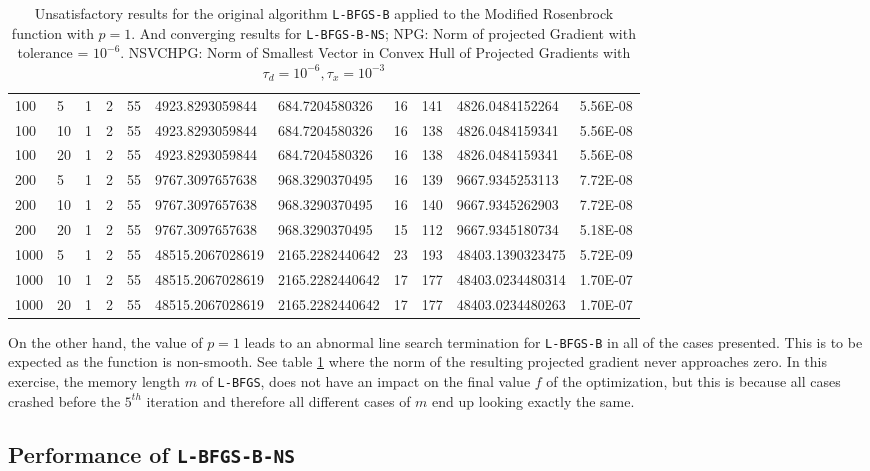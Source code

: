 \begin{table}
\begin{center}
\begin{tabular}{|l|l|l|l|l|l|l|l|l|l|l|}
      100 & 5 & 1 & 2 & 55 & 4923.8293059844 & 684.7204580326 & 16 & 141 & 4826.0484152264 & 5.56E-08\\
      100 & 10 & 1 & 2 & 55 & 4923.8293059844 & 684.7204580326 & 16 & 138 & 4826.0484159341 & 5.56E-08\\
      100 & 20 & 1 & 2 & 55 & 4923.8293059844 & 684.7204580326 & 16 & 138 & 4826.0484159341 & 5.56E-08\\
      200 & 5 & 1 & 2 & 55 & 9767.3097657638 & 968.3290370495 & 16 & 139 & 9667.9345253113 & 7.72E-08\\
      200 & 10 & 1 & 2 & 55 & 9767.3097657638 & 968.3290370495 & 16 & 140 & 9667.9345262903 & 7.72E-08\\
      200 & 20 & 1 & 2 & 55 & 9767.3097657638 & 968.3290370495 & 15 & 112 & 9667.9345180734 & 5.18E-08\\
      1000 & 5 & 1 & 2 & 55 & 48515.2067028619 & 2165.2282440642 & 23 & 193 & 48403.1390323475 & 5.72E-09\\
      1000 & 10 & 1 & 2 & 55 & 48515.2067028619 & 2165.2282440642 & 17 & 177 & 48403.0234480314 & 1.70E-07\\
      1000 & 20 & 1 & 2 & 55 & 48515.2067028619 & 2165.2282440642 & 17 & 177 & 48403.0234480263 & 1.70E-07\\
      \hline
    \end{tabular}
    \caption[Modified Rosenbrock with $p = 1$]{Unsatisfactory results for the original algorithm \texttt{L-BFGS-B} applied to the Modified Rosenbrock function with $p = 1$. And converging results for \texttt{L-BFGS-B-NS}; NPG: Norm of projected Gradient with tolerance = $10^{-6}$. NSVCHPG: Norm of Smallest Vector in Convex Hull of Projected Gradients with $\tau_d = 10^{-6}, \tau_x = 10^{-3}$}
    \label{pequal1merged}
  \end{center}
\end{table}

On the other hand, the value of $p = 1$ leads to an abnormal line search termination for \texttt{L-BFGS-B} in all of the cases presented. This is to be expected as the function is non-smooth. See table \ref{pequal1merged} where the norm of the resulting projected gradient never approaches zero. In this exercise, the memory length $m$ of \texttt{L-BFGS}, does not have an impact on the final value $f$ of the optimization, but this is because all cases crashed before the $5^{th}$ iteration and therefore all different cases of $m$ end up looking exactly the same.

\subsection{Performance of \texttt{L-BFGS-B-NS}}

